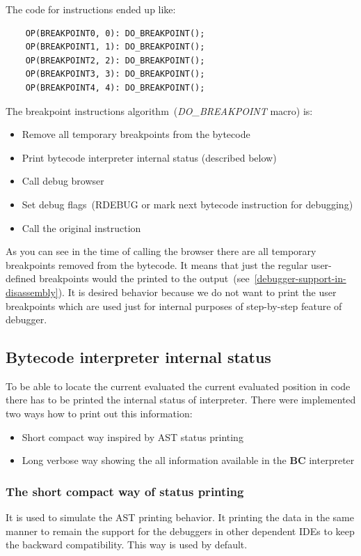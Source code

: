 \documentclass[thesis=M,english]{FITthesis}[2018/10/20]
\begin{document}
The code for instructions ended up like:

\begin{lstlisting}
    OP(BREAKPOINT0, 0): DO_BREAKPOINT();
    OP(BREAKPOINT1, 1): DO_BREAKPOINT();
    OP(BREAKPOINT2, 2): DO_BREAKPOINT();
    OP(BREAKPOINT3, 3): DO_BREAKPOINT();
    OP(BREAKPOINT4, 4): DO_BREAKPOINT();
\end{lstlisting}

The breakpoint instructions algorithm~(\textit{DO{\_}BREAKPOINT} macro) is:

\begin{itemize}
	\item Remove all temporary breakpoints from the bytecode
	\item Print bytecode interpreter internal status (described below)
	\item Call debug browser
	\item Set debug flags~(RDEBUG or mark next bytecode instruction for debugging)
	\item Call the original instruction
\end{itemize}

As you can see in the time of calling the browser there are all temporary breakpoints removed from the bytecode. It means that just the regular user-defined breakpoints would the printed to the output~(see~\ref{debugger-support-in-disassembly}). It is desired behavior because we do not want to print the user breakpoints which are used just for internal purposes of step-by-step feature of debugger.

\subsection{Bytecode interpreter internal status}

To be able to locate the current evaluated the current evaluated position in code there has to be printed the internal status of interpreter. There were implemented two ways how to print out this information:

\begin{itemize}
	\item Short compact way inspired by AST status printing
	\item Long verbose way showing the all information available in the \textbf{BC} interpreter
\end{itemize}

\subsubsection{The short compact way of status printing}
It is used to simulate the AST printing behavior. It printing the data in the same manner to remain the support for the debuggers in other dependent IDEs to keep the backward compatibility. This way is used by default.
\end{document}
